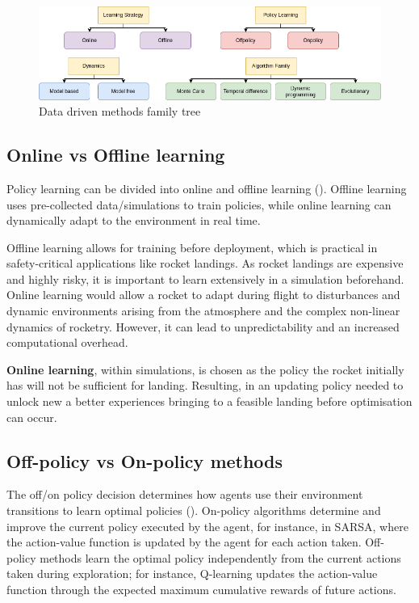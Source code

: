 \begin{figure}[H]
    \centering
    \includegraphics[width=0.85\linewidth]{figures/LiteratureStudy/DataDriven_familytree.png}
    \caption{Data driven methods family tree}
    \label{fig:data_driven_family_tree}
\end{figure}


\subsection{Online vs Offline learning}
\label{sec:line}

Policy learning can be divided into online and offline learning (\cite{sutton1998reinforcement}). Offline learning uses pre-collected data/simulations to train policies, while online learning can dynamically adapt to the environment in real time.

Offline learning allows for training before deployment, which is practical in safety-critical applications like rocket landings. As rocket landings are expensive and highly risky, it is important to learn extensively in a simulation beforehand. Online learning would allow a rocket to adapt during flight to disturbances and dynamic environments arising from the atmosphere and the complex non-linear dynamics of rocketry. However, it can lead to unpredictability and an increased computational overhead.

\textbf{Online learning}, within simulations, is chosen as the policy the rocket initially has will not be sufficient for landing. Resulting, in an updating policy needed to unlock new a better experiences bringing to a feasible landing before optimisation can occur.

\subsection{Off-policy vs On-policy methods}
\label{sec:policy}

The off/on policy decision determines how agents use their environment transitions to learn optimal policies (\cite{sutton1998reinforcement}). On-policy algorithms determine and improve the current policy executed by the agent, for instance, in SARSA, where the action-value function is updated by the agent for each action taken. Off-policy methods learn the optimal policy independently from the current actions taken during exploration; for instance, Q-learning updates the action-value function through the expected maximum cumulative rewards of future actions.

